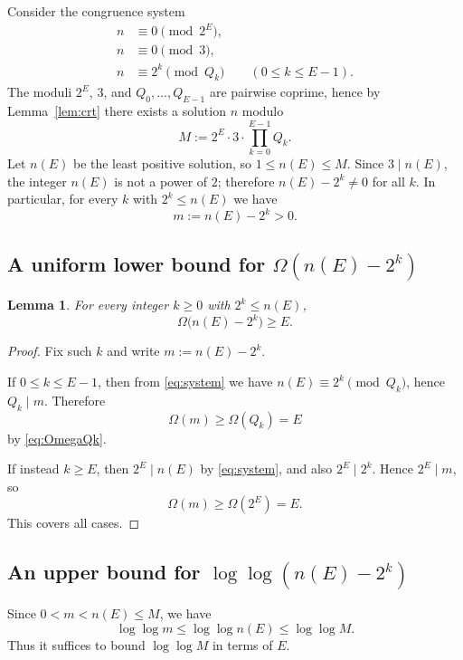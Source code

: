 \documentclass[11pt]{article}
\newtheorem{lemma}{Lemma}
\numberwithin{equation}{section}
\begin{document}
Consider the congruence system
\begin{equation}\label{eq:system}
\begin{aligned}
n &\equiv 0 \pmod{2^E},\\
n &\equiv 0 \pmod{3},\\
n &\equiv 2^k \pmod{Q_k}\qquad(0\le k\le E-1).
\end{aligned}
\end{equation}
The moduli $2^E$, $3$, and $Q_0,\dots,Q_{E-1}$ are pairwise coprime, hence by
Lemma~\ref{lem:crt} there exists a solution $n$ modulo
\begin{equation}\label{eq:M_def}
M:=2^E\cdot 3\cdot \prod_{k=0}^{E-1}Q_k.
\end{equation}
Let $n(E)$ be the least positive solution, so $1\le n(E)\le M$.
Since $3\mid n(E)$, the integer $n(E)$ is not a power of $2$; therefore $n(E)-2^k\neq 0$ for all $k$.
In particular, for every $k$ with $2^k\le n(E)$ we have
\[
m:=n(E)-2^k>0.
\]

\subsection{A uniform lower bound for $\Omega(n(E)-2^k)$}

\begin{lemma}\label{lem:Omega_lower}
For every integer $k\ge 0$ with $2^k\le n(E)$,
\[
\Omega\bigl(n(E)-2^k\bigr)\ge E.
\]
\end{lemma}

\begin{proof}
Fix such $k$ and write $m:=n(E)-2^k$.

If $0\le k\le E-1$, then from \eqref{eq:system} we have $n(E)\equiv 2^k\pmod{Q_k}$, hence $Q_k\mid m$.
Therefore
\[
\Omega(m)\ge \Omega(Q_k)=E
\]
by \eqref{eq:OmegaQk}.

If instead $k\ge E$, then $2^E\mid n(E)$ by \eqref{eq:system}, and also $2^E\mid 2^k$.
Hence $2^E\mid m$, so
\[
\Omega(m)\ge \Omega(2^E)=E.
\]
This covers all cases.
\end{proof}

\subsection{An upper bound for $\log\log(n(E)-2^k)$}

Since $0<m<n(E)\le M$, we have
\begin{equation}\label{eq:loglog_reduce}
\log\log m\le \log\log n(E)\le \log\log M.
\end{equation}
Thus it suffices to bound $\log\log M$ in terms of $E$.
\end{document}
